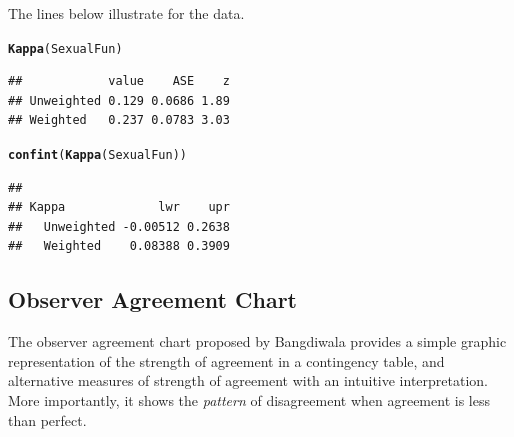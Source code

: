 \documentclass[11pt]{book}\usepackage[]{graphicx}\usepackage[]{color}
\makeatletter
\newcommand{\hlstd}[1]{\textcolor[rgb]{0.345,0.345,0.345}{#1}}%
\newcommand{\hlkwd}[1]{\textcolor[rgb]{0.737,0.353,0.396}{\textbf{#1}}}%
\newenvironment{kframe}{%
 \def\at@end@of@kframe{}%
 \ifinner\ifhmode%
  \def\at@end@of@kframe{\end{minipage}}%
  \begin{minipage}{\columnwidth}%
 \fi\fi%
 \def\FrameCommand##1{\hskip\@totalleftmargin \hskip-\fboxsep
 \colorbox{shadecolor}{##1}\hskip-\fboxsep
     \hskip-\linewidth \hskip-\@totalleftmargin \hskip\columnwidth}%
 \MakeFramed {\advance\hsize-\width
   \@totalleftmargin\z@ \linewidth\hsize
   \@setminipage}}%
 {\par\unskip\endMakeFramed%
 \at@end@of@kframe}
\newenvironment{knitrout}{}{} %
\renewenvironment{knitrout}{\small\renewcommand{\baselinestretch}{.85}}{} %
\makeatother
\begin{document}
The lines below illustrate  for the  data.
\begin{knitrout}
\color{fgcolor}\begin{kframe}
\begin{alltt}
\hlkwd{Kappa}\hlstd{(SexualFun)}
\end{alltt}
\begin{verbatim}
##            value    ASE    z
## Unweighted 0.129 0.0686 1.89
## Weighted   0.237 0.0783 3.03
\end{verbatim}
\begin{alltt}
\hlkwd{confint}\hlstd{(}\hlkwd{Kappa}\hlstd{(SexualFun))}
\end{alltt}
\begin{verbatim}
##             
## Kappa             lwr    upr
##   Unweighted -0.00512 0.2638
##   Weighted    0.08388 0.3909
\end{verbatim}
\end{kframe}
\end{knitrout}



\subsection[Observer Agreement Chart]{Observer Agreement Chart}
\label{sec:twoway:Bangdiwala}
The observer agreement chart proposed by Bangdiwala
\citeyearpar{Bangdiwala:1985,Bangdiwala:87} provides a simple
graphic representation of the strength of agreement in a contingency
table, and alternative measures of strength of agreement with an intuitive
interpretation. More importantly, it shows the \emph{pattern} of disagreement
when agreement is less than perfect.
\end{document}
